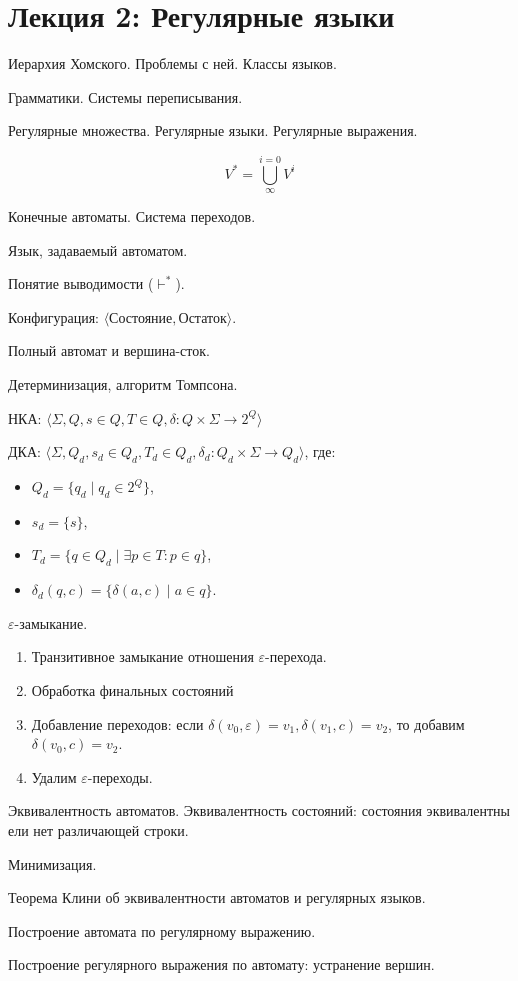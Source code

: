 \section{Лекция 2: Регулярные языки}

Иерархия Хомского. Проблемы с ней. Классы языков.

Грамматики. Системы переписывания.

Регулярные множества. Регулярные языки. Регулярные выражения. 

$$
V^* = \bigcup\limits^{i=0}_{\infty} V^i
$$

Конечные автоматы. Система переходов.

Язык, задаваемый автоматом. 

Понятие выводимости ($\vdash^*$). 

Конфигурация: $\langle \text{Состояние}, \text{Остаток} \rangle$.

Полный автомат и вершина-сток.

Детерминизация, алгоритм Томпсона.

НКА: $\langle \Sigma, Q, s \in Q, T \in Q, \delta: Q \times \Sigma \to 2^Q \rangle$

ДКА: $\langle \Sigma, Q_d, s_d \in Q_d,T_d \in Q_d, \delta_d:Q_d \times \Sigma \to Q_d\rangle$, где:

\begin{itemize}
\item $Q_d=\{q_d \mid q_d \in 2^Q\}$,
\item $s_d=\{s\}$,
\item $T_d=\{q \in Q_d \mid \exists p \in T : p \in q\}$,
\item $\delta_d(q,c)=\{\delta(a,c) \mid a \in q\}$.
\end{itemize}


$\varepsilon$-замыкание.
\begin{enumerate}
\item Транзитивное замыкание отношения $\varepsilon$-перехода.
\item Обработка финальных состояний
\item Добавление переходов: если $\delta(v_0,\varepsilon) = v_1, \delta(v_1,c) = v_2$, то добавим $\delta(v_0,c) = v_2$.
\item Удалим $\varepsilon$-переходы.
\end{enumerate}

Эквивалентность автоматов. Эквивалентность состояний: состояния эквивалентны ели нет различающей строки. 

Минимизация.


Теорема Клини об эквивалентности автоматов и регулярных языков.

Построение автомата по регулярному выражению.

Построение регулярного выражения по автомату: устранение вершин.

